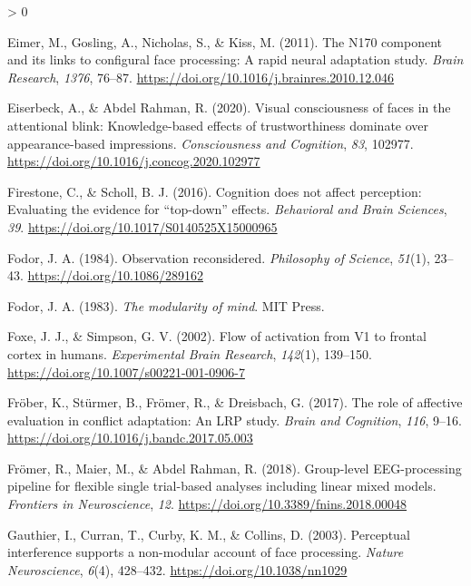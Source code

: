 \documentclass[
  english,
  man,12pt,twoside]{apa7}
\newlength{\cslhangindent}
\newenvironment{CSLReferences}[2] %
 {%
  \setlength{\parindent}{0pt}
  \ifodd #1 \everypar{\setlength{\hangindent}{\cslhangindent}}\ignorespaces\fi
  \ifnum #2 > 0
  \setlength{\parskip}{#2\baselineskip}
  \fi
 }%
 {}
\begin{document}
\begin{CSLReferences}{1}{0}
\leavevmode\hypertarget{ref-eimer2011}{}%
Eimer, M., Gosling, A., Nicholas, S., \& Kiss, M. (2011). The {N170} component and its links to configural face processing: A rapid neural adaptation study. \emph{Brain Research}, \emph{1376}, 76--87. \url{https://doi.org/10.1016/j.brainres.2010.12.046}

\leavevmode\hypertarget{ref-eiserbeck2020}{}%
Eiserbeck, A., \& Abdel Rahman, R. (2020). Visual consciousness of faces in the attentional blink: Knowledge-based effects of trustworthiness dominate over appearance-based impressions. \emph{Consciousness and Cognition}, \emph{83}, 102977. \url{https://doi.org/10.1016/j.concog.2020.102977}

\leavevmode\hypertarget{ref-firestone2016}{}%
Firestone, C., \& Scholl, B. J. (2016). Cognition does not affect perception: Evaluating the evidence for {``top-down''} effects. \emph{Behavioral and Brain Sciences}, \emph{39}. \url{https://doi.org/10.1017/S0140525X15000965}

\leavevmode\hypertarget{ref-fodor1984}{}%
Fodor, J. A. (1984). Observation reconsidered. \emph{Philosophy of Science}, \emph{51}(1), 23--43. \url{https://doi.org/10.1086/289162}

\leavevmode\hypertarget{ref-fodor1983}{}%
Fodor, J. A. (1983). \emph{The modularity of mind}. MIT Press.

\leavevmode\hypertarget{ref-foxe2002}{}%
Foxe, J. J., \& Simpson, G. V. (2002). Flow of activation from {V1} to frontal cortex in humans. \emph{Experimental Brain Research}, \emph{142}(1), 139--150. \url{https://doi.org/10.1007/s00221-001-0906-7}

\leavevmode\hypertarget{ref-fruxf6ber2017}{}%
Fröber, K., Stürmer, B., Frömer, R., \& Dreisbach, G. (2017). The role of affective evaluation in conflict adaptation: An {LRP} study. \emph{Brain and Cognition}, \emph{116}, 9--16. \url{https://doi.org/10.1016/j.bandc.2017.05.003}

\leavevmode\hypertarget{ref-fruxf6mer2018}{}%
Frömer, R., Maier, M., \& Abdel Rahman, R. (2018). Group-level {EEG}-processing pipeline for flexible single trial-based analyses including linear mixed models. \emph{Frontiers in Neuroscience}, \emph{12}. \url{https://doi.org/10.3389/fnins.2018.00048}

\leavevmode\hypertarget{ref-gauthier2003a}{}%
Gauthier, I., Curran, T., Curby, K. M., \& Collins, D. (2003). Perceptual interference supports a non-modular account of face processing. \emph{Nature Neuroscience}, \emph{6}(4), 428--432. \url{https://doi.org/10.1038/nn1029}


\end{CSLReferences}
\end{document}
